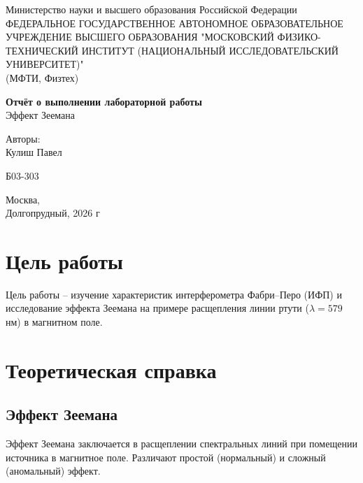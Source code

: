 \documentclass[12pt,a5paper,titlepage, main = russian]{article}
\begin{document}
\begin{titlepage}
\begin{center}
    \small{Министерство науки и высшего образования Российской Федерации}\\
    ФЕДЕРАЛЬНОЕ ГОСУДАРСТВЕННОЕ АВТОНОМНОЕ ОБРАЗОВАТЕЛЬНОЕ УЧРЕЖДЕНИЕ ВЫСШЕГО ОБРАЗОВАНИЯ "МОСКОВСКИЙ ФИЗИКО-ТЕХНИЧЕСКИЙ ИНСТИТУТ (НАЦИОНАЛЬНЫЙ ИССЛЕДОВАТЕЛЬСКИЙ УНИВЕРСИТЕТ)"\\
    (МФТИ, Физтех)
\end{center}
\vspace{2.5cm}
{\huge
    \begin{center}
        {\bf Отчёт о выполнении лабораторной работы}\\
        Эффект Зеемана
    \end{center}
}
\vspace{1.5cm}
\begin{flushright}
    {\large Авторы:\\  
Кулиш Павел \\
        \vspace{0.2cm}
        
        Б03-303}
\end{flushright}
\vspace{0.3cm}
\begin{center}
        Москва, \\
        Долгопрудный, 2026 г
\end{center}

\end{titlepage}


\tableofcontents
\newpage

\section{Цель работы}
Цель работы – изучение характеристик интерферометра Фабри–Перо (ИФП) и исследование эффекта Зеемана на примере расщепления линии ртути (\(\lambda = 579\) нм) в магнитном поле. 

\section{Теоретическая справка}
\subsection{Эффект Зеемана}
Эффект Зеемана заключается в расщеплении спектральных линий при помещении источника в магнитное поле. Различают простой (нормальный) и сложный (аномальный) эффект.
\end{document}
